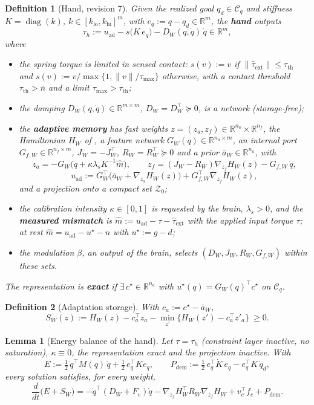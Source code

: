 \documentclass[11pt]{article}\usepackage[margin=1in]{geometry}\usepackage{amsmath,amssymb,amsthm,mathtools}\usepackage{graphicx}\graphicspath{{figures/}{../figures/}{figs/}{./}}\usepackage{enumitem}\usepackage{hyperref}\usepackage{cleveref}\usepackage{tikz}\usetikzlibrary{arrows.meta,positioning,calc,shapes.geometric}\usepackage{float}\usepackage{rotating}\usepackage[most]{tcolorbox}\usepackage{kotex}\usepackage{booktabs}\usepackage{longtable}\emergencystretch=1.6em\tolerance=2000 \crefname{assumption}{Assumption}{Assumptions}\Crefname{assumption}{Assumption}{Assumptions}\crefname{definition}{Definition}{Definitions}\Crefname{definition}{Definition}{Definitions}\crefname{proposition}{Proposition}{Propositions}\Crefname{proposition}{Proposition}{Propositions}\crefname{fact}{Fact}{Facts}\Crefname{fact}{Fact}{Facts} \newtheorem{assumption}{Assumption}\newtheorem{definition}{Definition}\newtheorem{lemma}{Lemma}\newtheorem{proposition}{Proposition}\newtheorem{theorem}{Theorem}\newtheorem{corollary}{Corollary}\newtheorem{fact}{Fact}\theoremstyle{remark}\newtheorem{remark}{Remark} \newcommand{\R}{\mathbb{R}}\newcommand{\xb}{\bar x}\newcommand{\Ab}{\bar A}\newcommand{\By}{\bar B_y}\newcommand{\U}{\mathcal U}\newcommand{\Z}{\mathcal Z}
\begin{document}
\begin{definition}[Hand, revision 7]
\label{def:hand7}
Given the realized goal $q_d\in\mathcal C_q$ and stiffness $K=\operatorname{diag}(k)$, $k\in[k_{\mathrm{lo}},k_{\mathrm{hi}}]^m$, with $e_q:=q-q_d\in\R^m$, the \textbf{\emph{hand}} outputs
\[
\tau_h:=u_{\mathrm{ad}}-s\big(K\,e_q\big)-D_W(q,\dot q)\,\dot q\in\R^m,
\]
where
\begin{itemize}
\item the spring torque is limited in sensed contact: $s(v):=v$ if $\|\hat\tau_{\mathrm{ext}}\|\le\tau_{\mathrm{th}}$ and $s(v):=v/\max\{1,\|v\|/\tau_{\max}\}$ otherwise, with a contact threshold $\tau_{\mathrm{th}}>\bar n$ and a limit $\tau_{\max}>\tau_{\mathrm{th}}$;
\item the damping $D_W(q,\dot q)\in\R^{m\times m}$, $D_W=D_W^\top\succeq0$, is a network (storage-free);
\item the \textbf{\emph{adaptive memory}} has fast weights $z=(z_a,z_f)\in\R^{n_a}\times\R^{n_f}$, the Hamiltonian $H_W$ of , a feature network $G_W(q)\in\R^{n_a\times m}$, an internal port $G_{f,W}\in\R^{n_f\times m}$, $J_W=-J_W^\top$, $R_W=R_W^\top\succeq0$ and a prior $\bar a_W\in\R^{n_a}$, with
\[
\dot z_a=-G_W\big(\dot q+\kappa\lambda_sK^{-1}\hat m\big),\qquad \dot z_f=(J_W-R_W)\nabla_{z_f}H_W(z)-G_{f,W}\,\dot q,
\]
\[
u_{\mathrm{ad}}:=G_W^\top\big(\bar a_W+\nabla_{z_a}H_W(z)\big)+G_{f,W}^\top\nabla_{z_f}H_W(z),
\]
and a projection onto a compact set $\mathcal Z_0$;
\item the calibration intensity $\kappa\in[0,1]$ is requested by the brain, $\lambda_s>0$, and the \textbf{\emph{measured mismatch}} is $\hat m:=u_{\mathrm{ad}}-\tau-\hat\tau_{\mathrm{ext}}$ with the applied input torque $\tau$; at rest $\hat m=u_{\mathrm{ad}}-u^\star-n$ with $u^\star:=g-d$;
\item the modulation $\beta$, an output of the brain, selects $(D_W,J_W,R_W,G_{f,W})$ within these sets.
\end{itemize}
The representation is \textbf{\emph{exact}} if $\exists\,c^\star\in\R^{n_a}$ with $u^\star(q)=G_W(q)^\top c^\star$ on $\mathcal C_q$.
\end{definition}

\begin{definition}[Adaptation storage]
\label{def:storage3}
With $c_a:=c^\star-\bar a_W$,
\[
S_W(z):=H_W(z)-c_a^\top z_a-\min_{z'}\big\{H_W(z')-c_a^\top z'_a\big\}\ \ge0 .
\]
\end{definition}

\begin{lemma}[Energy balance of the hand]
\label{lem:handbalance}
Let $\tau=\tau_h$ (constraint layer inactive, no saturation), $\kappa\equiv0$, the representation exact and the projection inactive. With
\[
E:=\tfrac12\,\dot q^\top M(q)\,\dot q+\tfrac12\,e_q^\top Ke_q,\qquad P_{\mathrm{dem}}:=\tfrac12\,e_q^\top\dot K\,e_q-e_q^\top K\,\dot q_d,
\]
every solution satisfies, for every weight,
\[
\frac{d}{dt}\big(E+S_W\big)=-\dot q^\top(D_W+F_v)\dot q-\nabla_{z_f}H_W^\top R_W\nabla_{z_f}H_W+v_c^\top f_e+P_{\mathrm{dem}} .
\]
\end{lemma}
\end{document}
